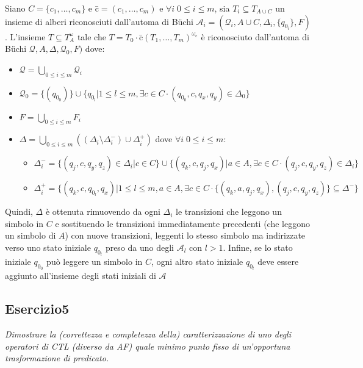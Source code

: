\documentclass[12pt]{article}
\newcommand{\buchi}{B\"uchi }
\begin{document}
Siano $C=\{c_1,\ldots,c_m\}$ e \=c$= ( c_1,\ldots,c_m)$ e $\forall i \; 0 \leq i \leq m$, sia $T_i \subseteq T_{A \cup C}$ un insieme di alberi riconosciuti dall'automa di \buchi $\mathcal{A}_i = (\mathcal{Q}_i,A \cup C,\Delta_i,\{ q_{0_i}\},F)$.
L'insieme $T\subseteq T^\omega_A$ tale che $T = T_0 \cdot$\=c$(T_1,\ldots,T_m)^{\omega_{\textrm{\=c}}}$ è riconosciuto dall'automa di \buchi $\mathcal{Q},A,\Delta,\mathcal{Q}_0,F)$ dove:
\begin{itemize}[leftmargin=10pt]
\item $\mathcal{Q} = \bigcup_{0\leq i\leq m}\mathcal{Q}_i$
\item $\mathcal{Q}_0 = \lbrace (q_{0_0}) \rbrace \cup \lbrace q_{0_l} \vert 1 \leq l \leq m, \exists c \in C \cdot (q_{0_0},c,q_x,q_y) \in \Delta_0 \rbrace$
\item $F = \bigcup_{0\leq i\leq m} F_i$
\item $\Delta = \bigcup_{0\leq i\leq m} ((\Delta_i \setminus \Delta^-_i) \cup \Delta^+_i)$ dove $\forall i \; 0 \leq i \leq m$:
	\begin{itemize}[leftmargin=15pt]
	\item $\Delta^-_i = \lbrace (q_j,c,q_y,q_z) \in \Delta_i \vert c \in C \rbrace \cup \lbrace (q_k,c,q_j,q_x) \vert a \in A, \exists c \in C \cdot (q_j,c,q_y,q_z) \in \Delta_i \rbrace$
	\item $\Delta^+_i = \lbrace (q_k,c,q_{0_l},q_x) \vert 1 \leq l \leq m, a \in A,\exists c \in C \cdot \lbrace (q_k,a,q_j,q_x),(q_j,c,q_y,q_z) \rbrace \subseteq \Delta^- \rbrace$
	\end{itemize}
\end{itemize}
Quindi, $\Delta$ è ottenuta rimuovendo da ogni $\Delta_i$ le transizioni che leggono un simbolo in $C$ e sostituendo le  transizioni immediatamente precedenti (che leggono un simbolo di $A$) con nuove transizioni, leggenti lo stesso simbolo ma indirizzate verso uno stato iniziale $q_{0_l}$ preso da uno degli $\mathcal{A}_l$ con $l > 1$.
Infine, se lo stato iniziale $q_{0_0}$ può leggere un simbolo in $C$, ogni altro stato iniziale $q_{0_l}$ deve essere aggiunto all'insieme degli stati iniziali di $\mathcal{A}$


\subsection*{Esercizio5}
\textit{Dimostrare la (correttezza e completezza della) caratterizzazione di uno degli operatori di CTL (diverso da AF) quale minimo punto fisso di un'opportuna trasformazione di predicato.}
\end{document}
